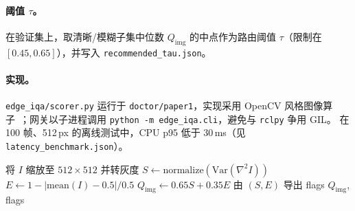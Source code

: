 \paragraph{阈值 $\tau$。}
在验证集上，取清晰/模糊子集中位数 $Q_{\mathrm{img}}$ 的中点作为路由阈值 $\tau$（限制在 $[0.45,0.65]$），并写入 \texttt{recommended\_tau.json}。

\paragraph{实现。}
\texttt{edge\_iqa/scorer.py} 运行于 \texttt{doctor/paper1}，实现采用 OpenCV 风格图像算子~\cite{opencv2020}；网关以子进程调用 \texttt{python -m edge\_iqa.cli}，避免与 \texttt{rclpy} 争用 GIL。
在 100 帧、512\,px 的离线测试中，CPU p95 低于 30\,ms（见 \texttt{latency\_benchmark.json}）。

\begin{algorithm}[t]
\caption{Edge-IQA 打分}
\begin{algorithmic}[1]
\STATE 将 $I$ 缩放至 $512\times512$ 并转灰度
\STATE $S \leftarrow \mathrm{normalize}(\mathrm{Var}(\nabla^2 I))$
\STATE $E \leftarrow 1 - | \mathrm{mean}(I) - 0.5 | / 0.5$
\STATE $Q_{\mathrm{img}} \leftarrow 0.65 S + 0.35 E$
\STATE 由 $(S,E)$ 导出 flags
\RETURN $Q_{\mathrm{img}}$, flags
\end{algorithmic}
\end{algorithm}
